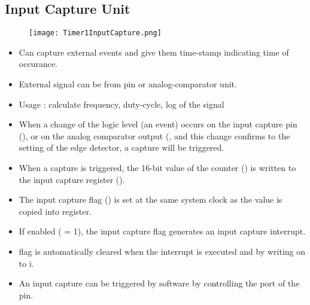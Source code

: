\documentclass{article}
\begin{document}
\subsection{Input Capture Unit}
\begin{figure}[H]
    \centering
    \texttt{[image: Timer1InputCapture.png]}
\end{figure}
\begin{itemize}
    \item Can capture external events and give them time-stamp indicating time of occurance.
    \item External signal can be from  pin or analog-comparator unit.
    \item Usage : calculate frequency, duty-cycle, log of the signal
    \item When a change of the logic level (an event) occurs on the input capture pin (), or on the analog comparator output (, and this change confirms to the setting of the edge detector, a capture will be triggered. 
    \item When a capture is triggered, the 16-bit value of the counter () is written to the input capture register ().
    \item The input capture flag () is set at the same system clock as the  value is copied into  register. 
    \item If enabled ( = 1), the input capture flag generates an input capture interrupt.
    \item {} flag is automatically cleared when the interrupt is executed and by writing on to i.
    \item An input capture can be triggered by software by controlling the port of the  pin.
\end{itemize}
\end{document}
